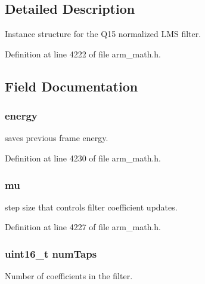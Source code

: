 \subsection{Detailed Description}
Instance structure for the Q15 normalized L\+MS filter. 

Definition at line 4222 of file arm\+\_\+math.\+h.



\subsection{Field Documentation}
\subsubsection[{\texorpdfstring{energy}{energy}}]{ energy}\hypertarget{structarm__lms__norm__instance__q15_ae7a8ccabc82348f6742ca7a2b3da2a41}{}\label{structarm__lms__norm__instance__q15_ae7a8ccabc82348f6742ca7a2b3da2a41}
saves previous frame energy. 

Definition at line 4230 of file arm\+\_\+math.\+h.

\subsubsection[{\texorpdfstring{mu}{mu}}]{ mu}\hypertarget{structarm__lms__norm__instance__q15_aab4745770bd667de040227eec1b5ff8d}{}\label{structarm__lms__norm__instance__q15_aab4745770bd667de040227eec1b5ff8d}
step size that controls filter coefficient updates. 

Definition at line 4227 of file arm\+\_\+math.\+h.

\subsubsection[{\texorpdfstring{num\+Taps}{numTaps}}]{\setlength{\rightskip}{0pt plus 5cm}uint16\+\_\+t num\+Taps}\hypertarget{structarm__lms__norm__instance__q15_a751941891e47f522a7f5375fe8990aac}{}\label{structarm__lms__norm__instance__q15_a751941891e47f522a7f5375fe8990aac}
Number of coefficients in the filter. 

